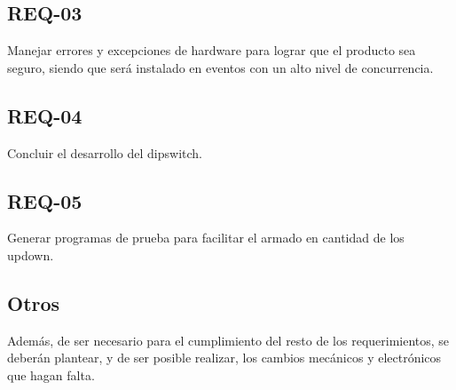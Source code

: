 \subsection{REQ-03}
Manejar errores y excepciones de hardware para lograr que el producto sea seguro, siendo que será instalado en eventos con un alto nivel de concurrencia.
\subsection{REQ-04}
Concluir el desarrollo del dipswitch.
\subsection{REQ-05}
Generar programas de prueba para facilitar el armado en cantidad de los updown.
\subsection{Otros}
Además, de ser necesario para el cumplimiento del resto de los requerimientos, se deberán plantear, y de ser posible realizar, los cambios mecánicos y electrónicos que hagan falta.








